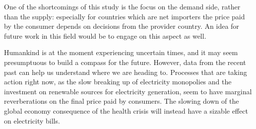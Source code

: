 \documentclass[a4paper,12pt]{book}
\begin{document}
One of the shortcomings of this study is the focus on the demand side, rather than the supply: especially for countries which are net importers the price paid by the consumer depends on decisions from the provider country. An idea for future work in this field would be to engage on this aspect as well.

Humankind is at the moment experiencing uncertain times, and it may seem presumptuous to build a compass for the future. However, data from the recent past can help us understand where we are heading to. Processes that are taking action right now, as the slow breaking up of electricity monopolies and the investment on renewable sources for electricity generation, seem to have marginal reverberations on the final price paid by consumers. The slowing down of the global economy consequence of the health crisis will instead have a sizable effect on electricity bills. 
\end{document}
